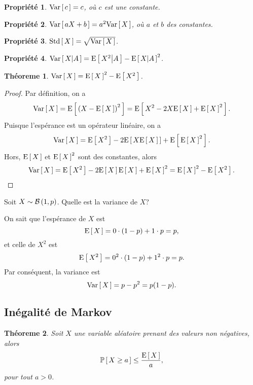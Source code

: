 \documentclass[11pt]{article}
\renewcommand\P[1]{%
	\ensuremath{%
		\mathbb{P}\left[\,#1\,\right]%
	}%
}%
\newcommand\Bin[2]{%
	\ensuremath{%
		\mathcal{B}\left(#1,#2\right)%
	}%
}%
\newcommand\Esp[1]{%
	\ensuremath{%
		\mathrm{E}\left[\,#1\,\right]%
	}%
}%
\newcommand\Espg[2]{%
	\ensuremath{%
		\mathrm{E}\left[\,#1\middle\vert#2\,\right]%
	}%
}%
\newcommand\Var[1]{%
	\ensuremath{%
		\mathrm{Var}\left[\,#1\,\right]%
	}%
}%
\newcommand\Varg[2]{%
	\ensuremath{%
		\mathrm{Var}\left[\,#1\middle\vert#2\,\right]%
	}%
}%
\newcommand\Std[1]{%
	\ensuremath{%
		\mathrm{Std}\left[\,#1\,\right]%
	}%
}%
\newtheorem{theoreme}{Théoreme}[section]
\newtheorem{property}{Propriété}
\theoremstyle{remark}
\theoremstyle{definition}
\begin{document}
\begin{property}
	$\Var{c}=c$, où $c$ est une constante.
\end{property}

\begin{property}
	$\Var{aX+b}=a^2\Var{X}$, où $a$ et $b$ des constantes.
\end{property}

\begin{property}
	$\Std{X}=\sqrt{\Var{X}}$.
\end{property}

\begin{property}
	$\Varg{X}{A}=\Espg{X^2}{A}-\Espg{X}{A}^2$.
\end{property}

\begin{theoreme}
	$\Var{X}=\Esp{X}^2-\Esp{X^2}$.
\end{theoreme}

\begin{proof}
	Par définition, on a
	\begin{equation*}
		\Var{X}
		=\Esp{\left(X-\Esp{X}\right)^2}
		=\Esp{X^2-2X\Esp{X}+\Esp{X}^2}.
	\end{equation*}
	Puisque l'espérance est un opérateur linéaire, on a
	\begin{equation*}
		\Var{X}
		=\Esp{X^2}-2\Esp{X\Esp{X}}+\Esp{\Esp{X}^2}.
	\end{equation*}
	Hors, $\Esp{X}$ et $\Esp{X}^2$ sont des constantes, alors
	\begin{equation*}
		\Var{X}
		=\Esp{X^2}-2\Esp{X}\Esp{X}+\Esp{X}^2
		=\Esp{X}^2-\Esp{X^2}.\qedhere
	\end{equation*}
\end{proof}

\begin{exemple}
	Soit $X\sim\Bin{1}{p}$. Quelle est la variance de $X$?

	On sait que l'espérance de $X$ est
	\begin{equation*}
		\Esp{X}=0\cdot(1-p)+1\cdot p=p,
	\end{equation*}
	et celle de $X^2$ est
	\begin{equation*}
		\Esp{X^2}=0^2\cdot(1-p)+1^2\cdot p=p.
	\end{equation*}
	Par conséquent, la variance est
	\begin{equation*}
		\Var{X}=p-p^2=p(1-p).
	\end{equation*}
\end{exemple}

\subsection{Inégalité de Markov}
\begin{theoreme}
	Soit $X$ une variable aléatoire prenant des valeurs non négatives, alors
	\begin{equation*}
		\P{X\geq a}\leq\frac{\Esp{X}}{a},
	\end{equation*}
	pour tout $a>0$.
\end{theoreme}
\end{document}

